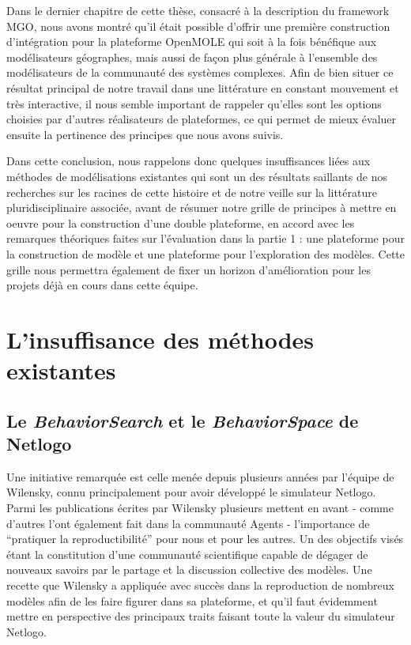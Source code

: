 

Dans le dernier chapitre de cette thèse, consacré à la description du framework MGO, nous avons montré qu'il était possible d'offrir une première construction d'intégration pour la plateforme OpenMOLE qui soit à la fois bénéfique aux modélisateurs géographes, mais aussi de façon plus générale à l'ensemble des modélisateurs de la communauté des systèmes complexes. Afin de bien situer ce résultat principal de notre travail dans une littérature en constant mouvement et très interactive, il nous semble important de rappeler qu'elles sont les options choisies par d'autres réalisateurs de plateformes, ce qui permet de mieux évaluer ensuite la pertinence des principes que nous avons suivis.

Dans cette conclusion, nous rappelons donc quelques insuffisances liées aux méthodes de modélisations existantes qui sont un des résultats saillants de nos recherches sur les racines de cette histoire et de notre veille sur la littérature pluridisciplinaire associée, avant de résumer notre grille de principes à mettre en oeuvre pour la construction d'une double plateforme, en accord avec les remarques théoriques faites sur l'évaluation dans la partie 1 : une plateforme pour la construction de modèle et une plateforme pour l'exploration des modèles. Cette grille nous permettra également de fixer un horizon d'amélioration pour les projets déjà en cours dans cette équipe. 

\section{L'insuffisance des méthodes existantes}
\label{sec:insuffisance_plateformes}

\subsection{Le \textit{BehaviorSearch} et le \textit{BehaviorSpace} de Netlogo}

Une initiative remarquée est celle menée depuis plusieurs années par l'équipe de Wilensky, connu principalement pour avoir développé le simulateur Netlogo. Parmi les publications écrites par Wilensky plusieurs mettent en avant \autocite{Wilensky2007a} - comme d'autres l'ont également fait dans la communauté Agents \autocites{Rouchier2013, Axtell1996} - l'importance de \enquote{pratiquer la reproductibilité} pour nous et pour les autres. Un des objectifs visés étant la constitution d'une communauté scientifique capable de dégager de nouveaux savoirs par le partage et la discussion collective des modèles. Une recette que Wilensky a appliquée avec succès dans la reproduction de nombreux modèles afin de les faire figurer dans sa plateforme, et qu'il faut évidemment mettre en perspective des principaux traits faisant toute la valeur du simulateur Netlogo. 

